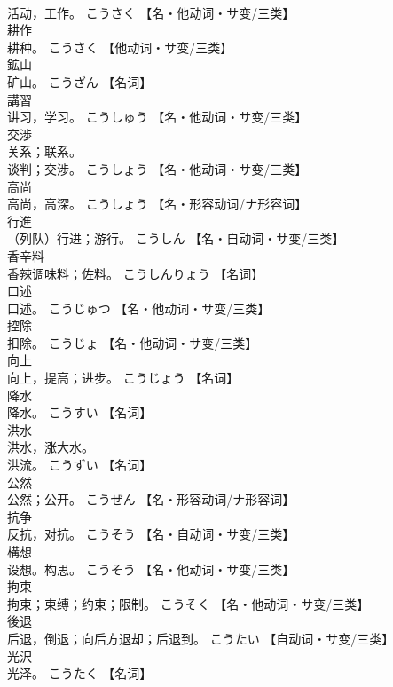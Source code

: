 \documentclass[8pt]{extreport}
\begin{document}
\begin{CJK}{UTF8}{min}
\\	活动，工作。	こうさく		【名・他动词・サ变/三类】
\\	耕作	
\\	耕种。	こうさく		【他动词・サ变/三类】
\\	鉱山	
\\	矿山。	こうざん		【名词】
\\	講習	
\\	讲习，学习。	こうしゅう		【名・他动词・サ变/三类】
\\	交渉	
\\	关系；联系。 
\\	谈判；交涉。	こうしょう		【名・他动词・サ变/三类】
\\	高尚	
\\	高尚，高深。	こうしょう		【名・形容动词/ナ形容词】
\\	行進	
\\	（列队）行进；游行。	こうしん		【名・自动词・サ变/三类】
\\	香辛料	
\\	香辣调味料；佐料。	こうしんりょう		【名词】
\\	口述	
\\	口述。	こうじゅつ		【名・他动词・サ变/三类】
\\	控除	
\\	扣除。	こうじょ		【名・他动词・サ变/三类】
\\	向上	
\\	向上，提高；进步。	こうじょう		【名词】
\\	降水	
\\	降水。	こうすい		【名词】
\\	洪水	
\\	洪水，涨大水。 
\\	洪流。	こうずい		【名词】
\\	公然	
\\	公然；公开。	こうぜん		【名・形容动词/ナ形容词】
\\	抗争	
\\	反抗，对抗。	こうそう		【名・自动词・サ变/三类】
\\	構想	
\\	设想。构思。	こうそう		【名・他动词・サ变/三类】
\\	拘束	
\\	拘束；束缚；约束；限制。	こうそく		【名・他动词・サ变/三类】
\\	後退	
\\	后退，倒退；向后方退却；后退到。	こうたい		【自动词・サ变/三类】
\\	光沢	
\\	光泽。	こうたく		【名词】

\end{CJK}
\end{document}
